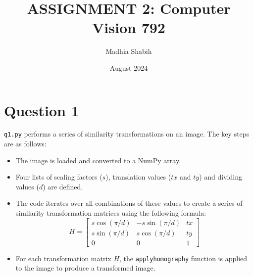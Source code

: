 \documentclass{article}
\title{ASSIGNMENT 2: Computer Vision 792}
\author{Madhia Shabih}
\date{August 2024}
\begin{document}
\maketitle
\section{Question 1}

\texttt{q1.py} performs a series of similarity transformations on an image. The key steps are as follows:

\begin{itemize}
    \item The image is loaded and converted to a NumPy array.
    \item Four lists of scaling factors ($s$), translation values ($tx$ and $ty$) and dividing values ($d$) are defined.
    \item The code iterates over all combinations of these values to create a series of similarity transformation matrices using the following formula:
    \[
    H = \begin{bmatrix}
    s \cos(\pi/d) & -s \sin(\pi/d) & tx \\
    s \sin(\pi/d) & s \cos(\pi/d) & ty \\
    0 & 0 & 1
    \end{bmatrix}
    \]
    \item For each transformation matrix $H$, the \texttt{applyhomography} function is applied to the image to produce a transformed image.
\end{itemize}
\end{document}

